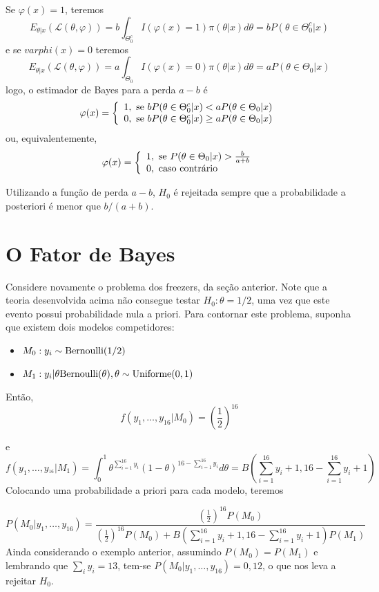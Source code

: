 \documentclass[
  letterpaper,
  DIV=11,
  numbers=noendperiod]{scrreprt}
\theoremstyle{definition}
\theoremstyle{definition}
\theoremstyle{plain}
\theoremstyle{remark}
\begin{document}
Se \(\varphi(x)=1\), teremos
\[E_{\theta|x}(\mathcal{L}(\theta,\varphi))=b\int_{\Theta_0^c}I(\varphi(x)=1)\pi(\theta|x)d\theta=bP(\theta\in\Theta_0^c|x)\]
e se \(varphi(x)=0\) teremos
\[E_{\theta|x}(\mathcal{L}(\theta,\varphi))=a\int_{\Theta_0}I(\varphi(x)=0)\pi(\theta|x)d\theta=aP(\theta\in\Theta_0|x)\]
logo, o estimador de Bayes para a perda \(a-b\) é
\[\varphi(x)=\left\{\begin{array}{l}1,\hbox{ se }bP(\theta\in\Theta_0^c|x)<aP(\theta\in\Theta_0|x)\\
0,\hbox{ se }bP(\theta\in\Theta_0^c|x)\geq aP(\theta\in\Theta_0|x)\end{array}\right.\]
ou, equivalentemente,
\[\varphi(x)=\left\{\begin{array}{l}1,\hbox{ se }P(\theta\in\Theta_0|x)>\frac{b}{a+b}\\
0,\hbox{ caso contrário}\end{array}\right.\]

Utilizando a função de perda \(a-b\), \(H_0\) é rejeitada sempre que a
probabilidade a posteriori é menor que \(b/(a+b)\).


\chapter{O Fator de Bayes}\label{o-fator-de-bayes}

Considere novamente o problema dos freezers, da seção anterior. Note que
a teoria desenvolvida acima não consegue testar \(H_0:\theta=1/2\), uma
vez que este evento possui probabilidade nula a priori. Para contornar
este problema, suponha que existem dois modelos competidores:

\begin{itemize}
\item
  \(M_0: y_i\sim\hbox{Bernoulli}(1/2)\)
\item
  \(M_1: y_i|\theta\hbox{Bernoulli}(\theta), \theta\sim\hbox{Uniforme}(0,1)\)
\end{itemize}

Então, \[f(y_1,\ldots,y_{16}|M_0)=\left(\frac{1}{2}\right)^{16}\]

e
\[f(y_1,\ldots,y_{^16}|M_1)=\int_0^1\theta^{\sum_{i=1}^{16}y_i}(1-\theta)^{16-\sum_{i=1}^{16}y_i}d\theta=B\left(\sum_{i=1}^{16}y_i+1,16-\sum_{i=1}^{16}y_i+1\right)\]
Colocando uma probabilidade a priori para cada modelo, teremos

\[P(M_0|y_1,\ldots,y_{16})=\frac{\left(\frac{1}{2}\right)^{16}P(M_0)}{\left(\frac{1}{2}\right)^{16}P(M_0)+B\left(\sum_{i=1}^{16}y_i+1,16-\sum_{i=1}^{16}y_i+1\right)P(M_1)}\]
Ainda considerando o exemplo anterior, assumindo \(P(M_0)=P(M_1)\) e
lembrando que \(\sum_i y_i=13\), tem-se
\(P(M_0|y_1,\ldots,y_{16})=0,12\), o que nos leva a rejeitar \(H_0\).
\end{document}
